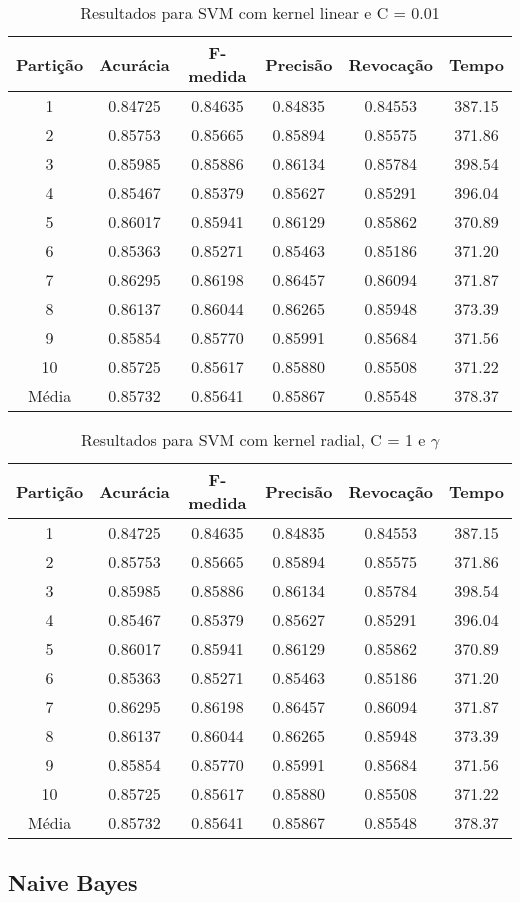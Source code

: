 \begin{table}[h]
\centering
\caption{Resultados para SVM com kernel linear e C = 0.01}
\vspace{0.2cm}
\begin{tabular}{c|c|c|c|c|c}
Partição & Acurácia & F-medida & Precisão & Revocação & Tempo \\
\hline
1  & 0.84725 & 0.84635 & 0.84835 & 0.84553 & 387.15 \\ 
2  & 0.85753 & 0.85665 & 0.85894 & 0.85575 & 371.86 \\
3  & 0.85985 & 0.85886 & 0.86134 & 0.85784 & 398.54 \\
4  & 0.85467 & 0.85379 & 0.85627 & 0.85291 & 396.04 \\
5  & 0.86017 & 0.85941 & 0.86129 & 0.85862 & 370.89 \\
6  & 0.85363 & 0.85271 & 0.85463 & 0.85186 & 371.20 \\
7  & 0.86295 & 0.86198 & 0.86457 & 0.86094 & 371.87 \\
8  & 0.86137 & 0.86044 & 0.86265 & 0.85948 & 373.39 \\
9  & 0.85854 & 0.85770 & 0.85991 & 0.85684 & 371.56 \\
10 & 0.85725 & 0.85617 & 0.85880 & 0.85508 & 371.22 \\
\hline
Média & 0.85732 & 0.85641 & 0.85867 & 0.85548 & 378.37 \\

\end{tabular} 
\label{table:resultadosSVMLinear}
\end{table}

\begin{table}[h]
\centering
\caption{Resultados para SVM com kernel radial, C = 1 e \(\gamma\) }
\vspace{0.2cm}
\begin{tabular}{c|c|c|c|c|c}
Partição & Acurácia & F-medida & Precisão & Revocação & Tempo \\
\hline
1  & 0.84725 & 0.84635 & 0.84835 & 0.84553 & 387.15 \\ 
2  & 0.85753 & 0.85665 & 0.85894 & 0.85575 & 371.86 \\
3  & 0.85985 & 0.85886 & 0.86134 & 0.85784 & 398.54 \\
4  & 0.85467 & 0.85379 & 0.85627 & 0.85291 & 396.04 \\
5  & 0.86017 & 0.85941 & 0.86129 & 0.85862 & 370.89 \\
6  & 0.85363 & 0.85271 & 0.85463 & 0.85186 & 371.20 \\
7  & 0.86295 & 0.86198 & 0.86457 & 0.86094 & 371.87 \\
8  & 0.86137 & 0.86044 & 0.86265 & 0.85948 & 373.39 \\
9  & 0.85854 & 0.85770 & 0.85991 & 0.85684 & 371.56 \\
10 & 0.85725 & 0.85617 & 0.85880 & 0.85508 & 371.22 \\
\hline
Média & 0.85732 & 0.85641 & 0.85867 & 0.85548 & 378.37 \\

\end{tabular} 
\label{table:resultadosSVMRadial}
\end{table}

\subsection{Naive Bayes}

